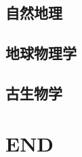 \documentclass[UTF8]{../NatureUniverse}
\begin{document}
\section{自然地理}

\section{地球物理学}
\section{古生物学}






\chapter{END}
\end{document}
